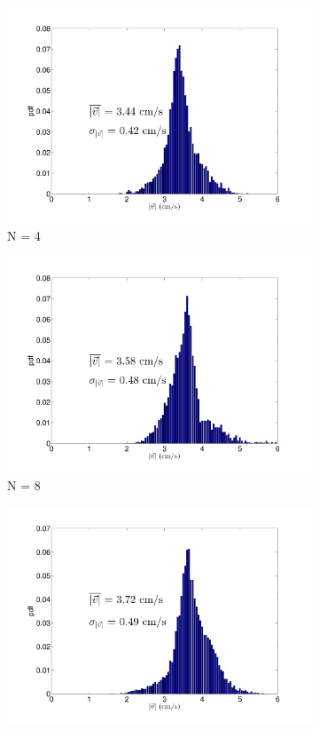 \documentclass[12pt]{article}
\begin{document}
\begin{figure}[h!]
\begin{subfigure}[h!]{0.5\textwidth}
       \includegraphics[scale=0.28]{cb_4_3mm_250mm_v_pdf.pdf}
       \caption{N = 4}
       \label{fig:vpdf_4_25cm}
	\end{subfigure}
	\hfill
	\begin{subfigure}[h!]{0.5\textwidth}
    \centering
       \includegraphics[scale=0.28]{cb_8_3mm_250mm_v_pdf.pdf}
       \caption{N = 8}
       \label{fig:vpdf_8_25cm}
	\end{subfigure}
	\begin{subfigure}[h!]{\textwidth}
    \centering
       \includegraphics[scale=0.28]{cb_16_3mm_250mm_v_pdf.pdf}

\end{subfigure}
\end{figure}
\end{document}
